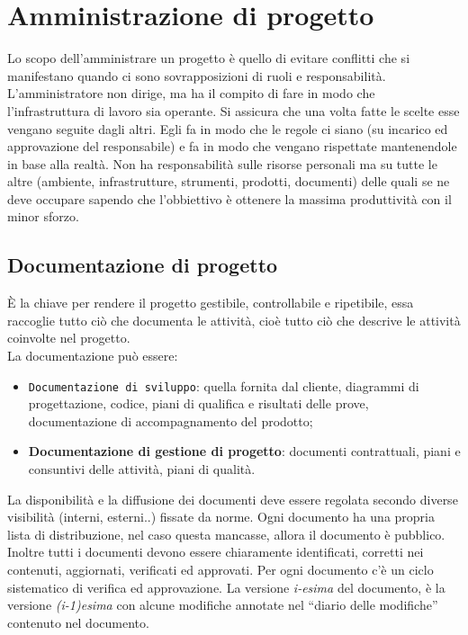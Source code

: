 \section{Amministrazione di progetto}
Lo scopo dell'amministrare un progetto è quello di evitare conflitti che si manifestano quando ci sono sovrapposizioni di ruoli e responsabilità. 
L'amministratore non dirige, ma ha il compito di fare in modo che l'infrastruttura di lavoro sia operante. 
Si assicura che una volta fatte le scelte esse vengano seguite dagli altri.
Egli fa in modo che le regole ci siano (su incarico ed approvazione del responsabile) e fa in modo che vengano rispettate mantenendole in base alla realtà. 
Non ha responsabilità sulle risorse personali ma su tutte le altre (ambiente, infrastrutture, strumenti, prodotti, documenti) delle quali se ne deve occupare sapendo che l'obbiettivo è ottenere la massima produttività con il minor sforzo.

\subsection{Documentazione di progetto}
\`E la chiave per rendere il progetto gestibile, controllabile e ripetibile, essa raccoglie tutto ciò che documenta le attività, cioè tutto ciò che descrive le attività coinvolte nel progetto. \\
La documentazione può essere:
\begin{itemize}
\item \texttt{Documentazione di sviluppo}: quella fornita dal cliente, diagrammi di progettazione, codice, piani di qualifica e risultati delle prove, documentazione di accompagnamento del prodotto;
\item \textbf{Documentazione di gestione di progetto}: documenti contrattuali, piani e consuntivi delle attività, piani di qualità. 
\end{itemize}
La disponibilità e la diffusione dei documenti deve essere regolata secondo diverse visibilità (interni, esterni..) fissate da norme.
Ogni documento ha una propria lista di distribuzione, nel caso questa mancasse, allora il documento è pubblico. 
Inoltre tutti i documenti devono essere chiaramente identificati, corretti nei contenuti, aggiornati, verificati ed approvati. 
Per ogni documento c'è un ciclo sistematico di verifica ed approvazione. 
La versione \textit{i-esima} del documento, è la versione \textit{(i-1)esima} con alcune modifiche annotate nel ``diario delle modifiche'' contenuto nel documento.

